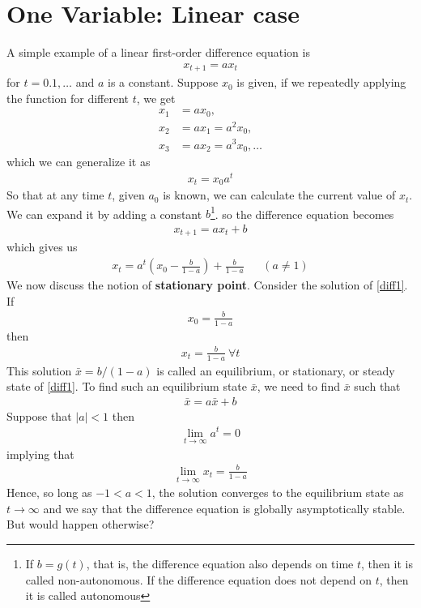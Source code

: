 \documentclass[11pt,a4paper]{book}
\theoremstyle{definition}\newtheorem{definition}{Definition}
\theoremstyle{definition}\newtheorem{fact}{Fact}
\theoremstyle{definition}\newtheorem{remark}{Remark}
\theoremstyle{definition}\newtheorem{ex}{Ex.}
\theoremstyle{definition}\newtheorem{project}{Project}
\theoremstyle{definition}\newtheorem{problem}{Problem}
\theoremstyle{definition}\newtheorem{example}{Example}
\numberwithin{theorem}{section}
\numberwithin{corollary}{chapter}
\numberwithin{assumption}{chapter}
\numberwithin{definition}{chapter}
\numberwithin{prop}{chapter}
\numberwithin{notation}{chapter}
\numberwithin{problem}{chapter}
\numberwithin{example}{chapter}
\numberwithin{fact}{chapter}
\numberwithin{ex}{chapter}
\begin{document}
	\section{One Variable: Linear case}
	A simple example of a linear first-order difference equation is
	\begin{align*}
		x_{t+1} = a x_t
	\end{align*}
	for $t = 0.1,\dots$ and $a$ is a constant. Suppose $x_0$ is given, if we repeatedly applying the function for different $t$, we get
	\begin{align*}
		x_1 &= a x_0, \\
		x_2 &= a x_1 = a^2 x_0, \\
		x_3 &= a x_2 = a^3 x_0, \dots
	\end{align*}
	which we can generalize it as
	\begin{align*}
		x_t = x_0 a^t
	\end{align*}
	So that at any time $t$, given $a_0$ is known, we can calculate the current value of $x_t$. We can expand it by adding a constant $b$\footnote{If $b = g(t)$, that is, the difference equation also depends on time $t$, then it is called non-autonomous. If the difference equation does not depend on $t$, then it is called autonomous}. so the difference equation becomes
		\begin{align}
			x_{t+1} = a x_t + b \label{diff1}
	\end{align}
	which gives us
	\begin{align*}
		x_t = a^t \left(x_0 - \frac{b}{1-a} \right) + \frac{b}{1-a} && (a \neq 1 )
	\end{align*}
	We now discuss the notion of \textbf{stationary point}. Consider the solution of \eqref{diff1}. If
	\begin{align*}
		x_0 = \frac{b}{1-a}
	\end{align*}
	then 
	\begin{align*}
		x_t = \frac{b}{1-a} \ \forall t
	\end{align*}
	This solution $\bar{x} = b/(1-a)$ is called an equilibrium, or stationary, or steady state of \eqref{diff1}. To find such an equilibrium state $\bar{x}$, we need to find $\bar{x}$ such that
	\begin{align*}
		\bar{x} = a \bar{x} + b
	\end{align*}
	Suppose that $|a| < 1$ then 
	\begin{align*}
		\lim_{t\to \infty} a^t = 0
	\end{align*}
	implying that
	\begin{align*}
		\lim_{t \to \infty} x_t = \frac{b}{1-a}
	\end{align*}
	Hence, so long as $-1 < a < 1$, the solution converges to the equilibrium state as $t\to \infty$ and we say that the difference equation is globally asymptotically stable. But would happen otherwise?
	
\end{document}
